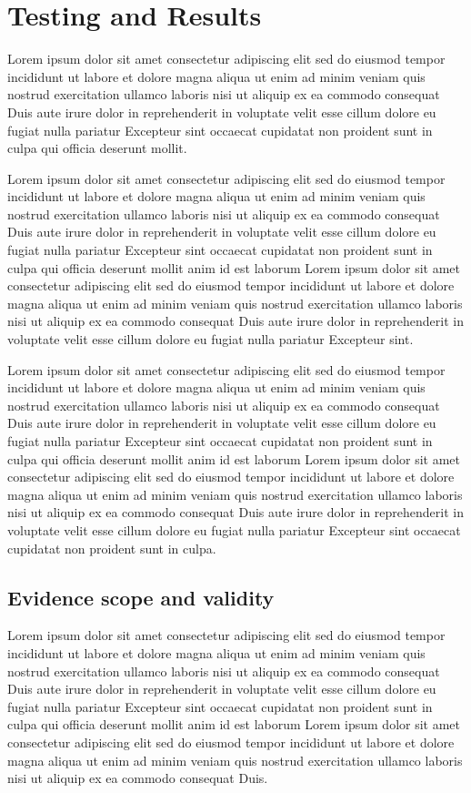 \section{Testing and Results}

Lorem ipsum dolor sit amet consectetur adipiscing elit sed do eiusmod tempor incididunt ut labore et dolore magna aliqua ut enim ad minim veniam quis nostrud exercitation ullamco laboris nisi ut aliquip ex ea commodo consequat Duis aute irure dolor in reprehenderit in voluptate velit esse cillum dolore eu fugiat nulla pariatur Excepteur sint occaecat cupidatat non proident sunt in culpa qui officia deserunt mollit.

Lorem ipsum dolor sit amet consectetur adipiscing elit sed do eiusmod tempor incididunt ut labore et dolore magna aliqua ut enim ad minim veniam quis nostrud exercitation ullamco laboris nisi ut aliquip ex ea commodo consequat Duis aute irure dolor in reprehenderit in voluptate velit esse cillum dolore eu fugiat nulla pariatur Excepteur sint occaecat cupidatat non proident sunt in culpa qui officia deserunt mollit anim id est laborum Lorem ipsum dolor sit amet consectetur adipiscing elit sed do eiusmod tempor incididunt ut labore et dolore magna aliqua ut enim ad minim veniam quis nostrud exercitation ullamco laboris nisi ut aliquip ex ea commodo consequat Duis aute irure dolor in reprehenderit in voluptate velit esse cillum dolore eu fugiat nulla pariatur Excepteur sint.

Lorem ipsum dolor sit amet consectetur adipiscing elit sed do eiusmod tempor incididunt ut labore et dolore magna aliqua ut enim ad minim veniam quis nostrud exercitation ullamco laboris nisi ut aliquip ex ea commodo consequat Duis aute irure dolor in reprehenderit in voluptate velit esse cillum dolore eu fugiat nulla pariatur Excepteur sint occaecat cupidatat non proident sunt in culpa qui officia deserunt mollit anim id est laborum Lorem ipsum dolor sit amet consectetur adipiscing elit sed do eiusmod tempor incididunt ut labore et dolore magna aliqua ut enim ad minim veniam quis nostrud exercitation ullamco laboris nisi ut aliquip ex ea commodo consequat Duis aute irure dolor in reprehenderit in voluptate velit esse cillum dolore eu fugiat nulla pariatur Excepteur sint occaecat cupidatat non proident sunt in culpa.

\subsection{Evidence scope and validity}
Lorem ipsum dolor sit amet consectetur adipiscing elit sed do eiusmod tempor incididunt ut labore et dolore magna aliqua ut enim ad minim veniam quis nostrud exercitation ullamco laboris nisi ut aliquip ex ea commodo consequat Duis aute irure dolor in reprehenderit in voluptate velit esse cillum dolore eu fugiat nulla pariatur Excepteur sint occaecat cupidatat non proident sunt in culpa qui officia deserunt mollit anim id est laborum Lorem ipsum dolor sit amet consectetur adipiscing elit sed do eiusmod tempor incididunt ut labore et dolore magna aliqua ut enim ad minim veniam quis nostrud exercitation ullamco laboris nisi ut aliquip ex ea commodo consequat Duis.

